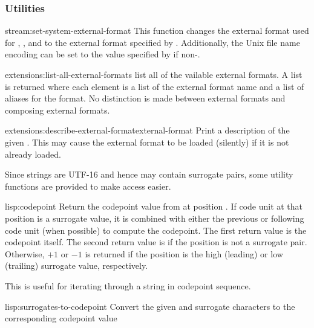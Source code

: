 \subsubsection{Utilities}

\begin{defun}{stream:}{set-system-external-format}{ \ampoptional{} }
  This function changes the external format used for
  , , and
   to the external format specified by
  .  Additionally, the Unix file name encoding can be
  set to the value specified by  if non-\nil.
\end{defun}

\begin{defun}{extensions:}{list-all-external-formats}{}
  list all of the vailable external formats.  A list is returned where
  each element is a list of the external format name and a list of
  aliases for the format.  No distinction is made between external
  formats and composing external formats.
\end{defun}

\begin{defun}{extensions:}{describe-external-format}{external-format}
  Print a description of the given .  This may
  cause the external format to be loaded (silently) if it is not
  already loaded.
\end{defun}

Since strings are UTF-16 and hence may contain surrogate pairs, some
utility functions are provided to make access easier.

\begin{defun}{lisp:}{codepoint}{\args {} 
    \ampoptional{} }
  Return the codepoint value from  at position .
  If code unit at that position is a surrogate value, it is combined
  with either the previous or following code unit (when possible) to
  compute the codepoint.  The first return value is the codepoint
  itself.  The second return value is \nil{} if the position is not a
  surrogate pair.  Otherwise, $+1$ or $-1$ is returned if the position
  is the high (leading) or low (trailing) surrogate value, respectively.

  This is useful for iterating through a string in codepoint sequence.
\end{defun}

\begin{defun}{lisp:}{surrogates-to-codepoint}{\args {} }
  Convert the given  and  surrogate characters to the
  corresponding codepoint value
\end{defun}

